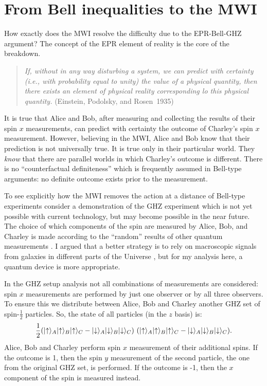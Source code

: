 \documentclass[12pt]{article}
\begin{document}
\section{From Bell inequalities to the MWI }

How exactly does the MWI resolve the difficulty due to the EPR-Bell-GHZ argument? The concept of the EPR element of reality is the core of the breakdown.
\begin{quote}
{\it   If, without in any way disturbing a system, we can predict with certainty (i.e., with
probability equal to unity) the value of a physical quantity, then there exists an element of physical reality corresponding lo this physical quantity.}
\flushright
 (Einstein, Podolsky, and Rosen~1935)
\end{quote}
 It is true that Alice and Bob, after measuring and collecting the results of their  spin $x$ measurements, can predict with certainty the outcome of Charley's spin $x$ measurement. However,  believing in the MWI, Alice and Bob know that their prediction is not universally true. It is true only in their particular world. They {\it know} that there are  parallel worlds in which Charley's outcome is different. There is  no ``counterfactual definiteness'' which is frequently assumed in Bell-type arguments: no definite outcome   exists  prior to the measurement.


To see explicitly how the MWI removes the action at a distance of Bell-type experiments consider a demonstration of the GHZ experiment which is not yet possible with current technology, but may become possible in the near future. The choice of which components of the spin are measured  by Alice, Bob, and Charley  is made according to the ``random''  results of other quantum measurements \cite{Sheid}.   I argued that a better strategy is to rely  on macroscopic signals from galaxies in different parts of the Universe \cite{VBell}, but for my analysis here, a quantum device is more appropriate.

In the GHZ setup analysis not all combinations of measurements are considered: spin $x$ measurements are performed by just one  observer or by all three observers. To ensure this we distribute between Alice, Bob and Charley another GHZ set of  spin-$\frac{1}{2}$ particles. So, the state of all particles  (in the $z$ basis) is:
\begin{equation}
\label{GHZ+}
  {1\over
  2}{\Large (}|{\uparrow}\rangle_A|{\uparrow}\rangle_B|{\uparrow}\rangle_C -
|{\downarrow}\rangle_A|{\downarrow}\rangle_B|{\downarrow}\rangle_C{\Large
)}~{\Large (}|{\uparrow}\rangle_A|{\uparrow}\rangle_B|{\uparrow}\rangle_C -
|{\downarrow}\rangle_A|{\downarrow}\rangle_B|{\downarrow}\rangle_C{\Large
)} .
\end{equation}
Alice, Bob and Charley perform spin $x$ measurement of their additional spins. If the outcome is 1,  then the spin $y$ measurement of the second particle, the one from the original GHZ set, is performed. If the outcome is -1, then the   $x$ component of the spin is measured instead.
\end{document}
